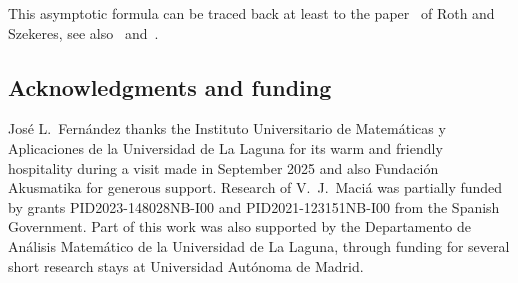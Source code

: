 \documentclass[12pt]{amsart}
\theoremstyle{definition}
\begin{document}
This asymptotic formula
can be traced back at least to the paper~\cite{RothSzekeres} of Roth and Szekeres, see also~\cite[Equation~23]{TranMurthyBhaduri} and~\cite{MurthyBrack}.

\subsection*{Acknowledgments and funding}

Jos\'e L.\ Fern\'andez thanks the Instituto Universitario de Matem\'aticas y Aplicaciones de la Universidad de La Laguna for its warm and
friendly hospitality during a visit made in September 2025 and also Fundaci\'on Akusmatika for generous support. Research of V.~J.\ Maci\'a was partially funded by grants PID2023-148028NB-I00 and
PID2021-123151NB-I00 from the Spanish Government. Part of this work was also supported by the Departamento de An\'alisis Matem\'atico de la Universidad de La Laguna,
through funding for several short research stays at Universidad Aut\'onoma de Madrid.
\end{document}
